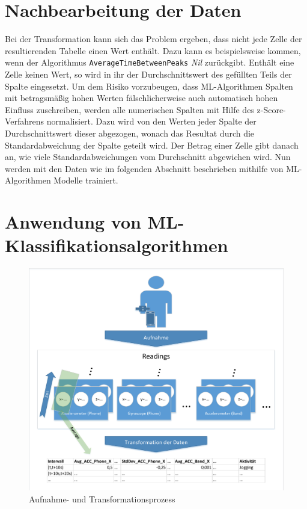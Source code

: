 \section{Nachbearbeitung der Daten}
\label{sec:postprocessing}
Bei der Transformation kann sich das Problem ergeben, dass nicht jede Zelle der resultierenden Tabelle einen Wert enthält. Dazu kann es beispielsweise kommen, wenn der Algorithmus \texttt{AverageTimeBetweenPeaks} \textit{Nil} zurückgibt. Enthält eine Zelle keinen Wert, so wird in ihr der Durchschnittswert des gefüllten Teils der Spalte eingesetzt. Um dem Risiko vorzubeugen, dass \ac{ML}-Algorithmen Spalten mit betragsmäßig hohen Werten fälschlicherweise auch automatisch hohen Einfluss zuschreiben, werden alle numerischen Spalten mit Hilfe des z-Score-Verfahrens normalisiert. Dazu wird von den Werten jeder Spalte der Durchschnittswert dieser abgezogen, wonach das Resultat durch die Standardabweichung der Spalte geteilt wird. Der Betrag einer Zelle gibt danach an, wie viele Standardabweichungen vom Durchschnitt abgewichen wird.
Nun werden mit den Daten wie im folgenden Abschnitt beschrieben mithilfe von ML-Algorithmen Modelle trainiert.

\section{Anwendung von \ac{ML}-Klassifikationsalgorithmen}
\label{section:ml-algos}

\begin{figure}[h]
	\centering
	\includegraphics[width=\textwidth,clip,trim=5mm 5mm 5mm 5mm]{img/transformation}
	\caption{Aufnahme- und Transformationsprozess}
	\label{fig:recording-and-transformation}
\end{figure}

